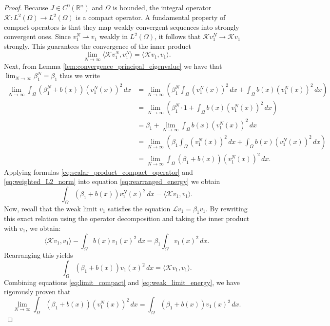 \documentclass[12pt, a4paper]{article}
\theoremstyle{break}
\theoremstyle{break}
\theoremstyle{break}
\theoremstyle{break}
\theoremstyle{break}
\theoremstyle{break}
\theoremstyle{break}
\theoremstyle{break}
\theoremstyle{break}
\begin{document}
\begin{proof}
    Because $J \in C^0(\mathbb{R}^n)$ and $\Omega$ is bounded, the integral operator $\mathcal{K} : L^2(\Omega) \to L^2(\Omega)$ is a compact operator. A fundamental property of compact operators is that they map weakly convergent sequences into strongly convergent ones. Since $v_1^N \rightharpoonup v_1$ weakly in $L^2(\Omega)$, it follows that $\mathcal{K} v_1^N \to \mathcal{K} v_1$ strongly. This guarantees the convergence of the inner product
    \begin{equation}
        \label{eq:scalar_product_compact_operator}
        \lim_{N \to \infty} \langle \mathcal{K} v_1^N, v_1^N \rangle = \langle \mathcal{K} v_1, v_1 \rangle.
    \end{equation}
    Next, from Lemma \ref{lem:convergence_principal_eigenvalue} we have that $\lim_{N \to \infty} \beta_1^N = \beta_1$ thus we write
    \begin{align}
        \lim_{N \to \infty} \int_\Omega (\beta_1^N + b(x)) (v_1^N(x))^2 \, dx 
        &= \lim_{N \to \infty} \left( \beta_1^N \int_\Omega (v_1^N(x))^2 \, dx + \int_\Omega b(x) (v_1^N(x))^2 \, dx \right) \nonumber \\
        &= \lim_{N \to \infty} \left( \beta_1^N \cdot 1 + \int_\Omega b(x) (v_1^N(x))^2 \, dx \right) \nonumber \\
        &= \beta_1 + \lim_{N \to \infty} \int_\Omega b(x) (v_1^N(x))^2 \, dx \nonumber \\
        &= \lim_{N \to \infty} \left( \beta_1 \int_\Omega (v_1^N(x))^2 \, dx + \int_\Omega b(x) (v_1^N(x))^2 \, dx \right) \nonumber \\
        &= \lim_{N \to \infty} \int_\Omega (\beta_1 + b(x)) (v_1^N(x))^2 \, dx.
        \label{eq:weighted_L2_norm}
    \end{align}
    Applying formulas \eqref{eq:scalar_product_compact_operator} and \eqref{eq:weighted_L2_norm} into equation \eqref{eq:rearranged_energy} we obtain
    \begin{equation} 
        \label{eq:limit_compact}
        \int_\Omega (\beta_1 + b(x)) v_1^N(x)^2 \, dx = \langle \mathcal{K} v_1, v_1 \rangle.
    \end{equation}
    Now, recall that the weak limit $v_1$ satisfies the equation $\mathcal{L} v_1 = \beta_1 v_1$. By rewriting this exact relation using the operator decomposition and taking the inner product with $v_1$, we obtain:
    \begin{equation}
        \langle \mathcal{K} v_1, v_1 \rangle - \int_\Omega b(x) v_1(x)^2 \, dx = \beta_1 \int_\Omega v_1(x)^2 \, dx.
    \end{equation}
    Rearranging this yields
    \begin{equation} \label{eq:weak_limit_energy}
        \int_\Omega (\beta_1 + b(x)) v_1(x)^2 \, dx = \langle \mathcal{K} v_1, v_1 \rangle.
    \end{equation}
    Combining equations \eqref{eq:limit_compact} and \eqref{eq:weak_limit_energy}, we have rigorously proven that
    \begin{equation} \label{eq:norm_convergence}
        \lim_{N \to \infty} \int_\Omega (\beta_1 + b(x)) (v_1^N(x))^2 \, dx = \int_\Omega (\beta_1 + b(x)) v_1(x)^2 \, dx.
    \end{equation}
    

\end{proof}
\end{document}
